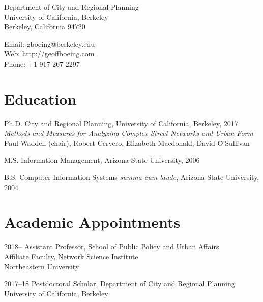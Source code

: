 \documentclass{academiccv}
\begin{document}
\raggedright

\namefont{\myname}

\vspace{1em}
\begin{minipage}[t]{0.495\textwidth}
  Department of City and Regional Planning \\
  University of California, Berkeley \\
  Berkeley, California 94720
\end{minipage}
\begin{minipage}[t]{0.495\textwidth}
  Email: gboeing@berkeley.edu \\
  Web: http://geoffboeing.com \\
  Phone: +1 917 267 2297
\end{minipage}
\vspace{0.5em}



\section*{Education}

\begin{tablist}
	
\item[Ph.D.] \tab City and Regional Planning, University of California, Berkeley, 2017 \\
                  \emph{Methods and Measures for Analyzing Complex Street Networks and Urban Form} \\
                  Paul Waddell (chair), Robert Cervero, Elizabeth Macdonald, David O'Sullivan
                  
\item[M.S.]  \tab Information Management, Arizona State University, 2006

\item[B.S.]  \tab Computer Information Systems \emph{summa cum laude}, Arizona State University, 2004

\end{tablist}



\section*{Academic Appointments}
\begin{tablist}                     
	
	\item[2018--]     \tab Assistant Professor, School of Public Policy and Urban Affairs \\
			 		       Affiliate Faculty, Network Science Institute \\
			 			   Northeastern University

	\item[2017--18]   \tab Postdoctoral Scholar, Department of City and Regional Planning \\
	                       University of California, Berkeley
	
\end{tablist}
\end{document}
